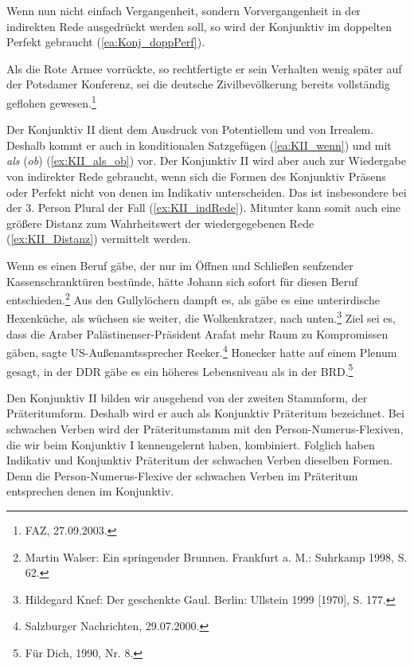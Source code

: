Wenn nun nicht einfach Vergangenheit, sondern Vorvergangenheit in der indirekten Rede ausgedrückt werden soll, so wird der Konjunktiv im doppelten Perfekt gebraucht (\ref{ea:Konj_doppPerf}).

\ea \label{ea:Konj_doppPerf} Als die Rote Armee vorrückte, so rechtfertigte er sein Verhalten wenig später auf der Potsdamer Konferenz, sei die deutsche Zivilbevölkerung bereits vollständig geflohen gewesen.\footnote{FAZ, 27.09.2003.}
\z 


\label{subsubsubsection:KonjII}

Der Konjunktiv II dient dem Ausdruck von Potentiellem und von Irrealem. Deshalb kommt er auch in konditionalen Satzgefügen (\ref{ea:KII_wenn}) und mit \textit{als} (\textit{ob}) (\ref{ex:KII_als_ob}) vor. Der Konjunktiv II wird aber auch zur Wiedergabe von indirekter Rede gebraucht, wenn sich die Formen des Konjunktiv Präsens oder Perfekt nicht von denen im Indikativ unterscheiden. Das ist insbesondere bei der 3. Person Plural der Fall (\ref{ex:KII_indRede}). Mitunter kann somit auch eine größere Distanz zum Wahrheitswert der wiedergegebenen Rede (\ref{ex:KII_Distanz}) vermittelt werden. 

\ea \label{ea:KII_Funktion}
\ea \label{ea:KII_wenn}  Wenn es einen Beruf gäbe, der nur im Öffnen und Schließen seufzender Kassenschranktüren bestünde, hätte Johann sich sofort für diesen Beruf entschieden.\footnote{Martin Walser: Ein springender Brunnen. Frankfurt a. M.: Suhrkamp 1998, S. 62.}
\ex \label{ex:KII_als_ob} Aus den Gullylöchern dampft es, als gäbe es eine unterirdische Hexenküche, als wüchsen sie weiter, die Wolkenkratzer, nach unten.\footnote{Hildegard Knef: Der geschenkte Gaul. Berlin: Ullstein 1999 [1970], S. 177.}
\ex \label{ex:KII_indRede} Ziel sei es, dass die Araber Palästinenser-Präsident Arafat mehr Raum zu Kompromissen gäben, sagte US-Außenamtssprecher Reeker.\footnote{Salzburger Nachrichten, 29.07.2000.}
\ex \label{ex:KII_Distanz} Honecker hatte auf einem Plenum gesagt, in der DDR gäbe es ein höheres Lebensniveau als in der BRD.\footnote{Für Dich, 1990, Nr. 8.}
\z 
\z 

Den Konjunktiv II bilden wir ausgehend von der zweiten Stammform, der Präteritumform. Deshalb wird er auch als Konjunktiv Präteritum bezeichnet. Bei schwachen Verben wird der Präteritumstamm mit den Person-Numerus-Flexiven, die wir beim Konjunktiv I kennengelernt haben, kombiniert. Folglich haben Indikativ und Konjunktiv Präteritum der schwachen Verben dieselben Formen. Denn die Person-Numerus-Flexive der schwachen Verben im Präteritum entsprechen denen im Konjunktiv. 

